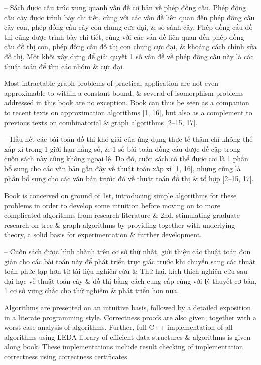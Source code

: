 \documentclass{article}
\begin{document}
\begin{itemize}
	-- Sách được cấu trúc xung quanh vấn đề cơ bản về phép đồng cấu. Phép đồng cấu cây được trình bày chi tiết, cùng với các vấn đề liên quan đến phép đồng cấu cây con, phép đồng cấu cây con chung cực đại, \& so sánh cây. Phép đồng cấu đồ thị cũng được trình bày chi tiết, cùng với các vấn đề liên quan đến phép đồng cấu đồ thị con, phép đồng cấu đồ thị con chung cực đại, \& khoảng cách chỉnh sửa đồ thị. Một khối xây dựng để giải quyết 1 số vấn đề về phép đồng cấu này là các thuật toán để tìm các nhóm \& cực đại.
	
	Most intractable graph problems of practical application are not even approximable to within a constant bound, \& several of isomorphism problems addressed in this book are no exception. Book can thus be seen as a companion to recent texts on approximation algorithms [1, 16], but also as a complement to previous texts on combinatorial \& graph algorithms [2--15, 17].
	
	-- Hầu hết các bài toán đồ thị khó giải của ứng dụng thực tế thậm chí không thể xấp xỉ trong 1 giới hạn hằng số, \& 1 số bài toán đồng cấu được đề cập trong cuốn sách này cũng không ngoại lệ. Do đó, cuốn sách có thể được coi là 1 phần bổ sung cho các văn bản gần đây về thuật toán xấp xỉ [1, 16], nhưng cũng là phần bổ sung cho các văn bản trước đó về thuật toán đồ thị \& tổ hợp [2--15, 17].
	
	Book is conceived on ground of 1st, introducing simple algorithms for these problems in order to develop some intuition before moving on to more complicated algorithms from research literature \& 2nd, stimulating graduate research on tree \& graph algorithms by providing together with underlying theory, a solid basis for experimentation \& further development.
	
	-- Cuốn sách được hình thành trên cơ sở thứ nhất, giới thiệu các thuật toán đơn giản cho các bài toán này để phát triển trực giác trước khi chuyển sang các thuật toán phức tạp hơn từ tài liệu nghiên cứu \& Thứ hai, kích thích nghiên cứu sau đại học về thuật toán cây \& đồ thị bằng cách cung cấp cùng với lý thuyết cơ bản, 1 cơ sở vững chắc cho thử nghiệm \& phát triển hơn nữa.
	
	Algorithms are presented on an intuitive basis, followed by a detailed exposition in a literate programming style. Correctness proofs are also given, together with a worst-case analysis of algorithms. Further, full C++ implementation of all algorithms using LEDA library of efficient data structures \& algorithms is given along book. These implementations include result checking of implementation correctness using correctness certificates.
	

\end{itemize}
\end{document}
